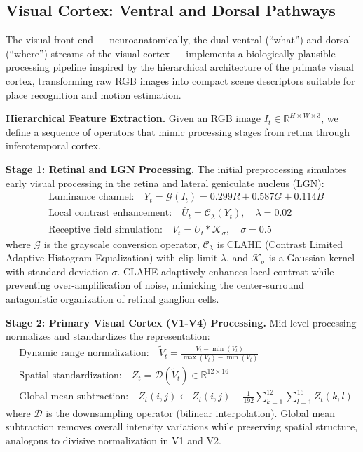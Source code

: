 \subsection{Visual Cortex: Ventral and Dorsal Pathways}
\label{sec:visual_cortex}

The visual front-end --- neuroanatomically, the dual ventral (``what'') and dorsal (``where'') streams of the visual cortex --- implements a biologically-plausible processing pipeline inspired by the hierarchical architecture of the primate visual cortex, transforming raw RGB images into compact scene descriptors suitable for place recognition and motion estimation.

\textbf{Hierarchical Feature Extraction.} Given an RGB image $I_t\in\mathbb{R}^{H\times W\times 3}$, we define a sequence of operators that mimic processing stages from retina through inferotemporal cortex.

\textbf{Stage 1: Retinal and LGN Processing.} The initial preprocessing simulates early visual processing in the retina and lateral geniculate nucleus (LGN):
\begin{align}
     & \text{Luminance channel:}\quad Y_t = \mathcal{G}(I_t) = 0.299R+0.587G+0.114B              \\
     & \text{Local contrast enhancement:}\quad \bar{U}_t = \mathcal{C}_\lambda(Y_t),\quad \lambda=0.02 \\
     & \text{Receptive field simulation:}\quad V_t = \bar{U}_t * \mathcal{K}_\sigma,\quad \sigma=0.5
\end{align}
where $\mathcal{G}$ is the grayscale conversion operator, $\mathcal{C}_\lambda$ is CLAHE (Contrast Limited Adaptive Histogram Equalization) with clip limit $\lambda$, and $\mathcal{K}_\sigma$ is a Gaussian kernel with standard deviation $\sigma$. CLAHE adaptively enhances local contrast while preventing over-amplification of noise, mimicking the center-surround antagonistic organization of retinal ganglion cells.

\textbf{Stage 2: Primary Visual Cortex (V1-V4) Processing.} Mid-level processing normalizes and standardizes the representation:
\begin{align}
     & \text{Dynamic range normalization:}\quad \tilde V_t = \frac{V_t-\min(V_t)}{\max(V_t)-\min(V_t)}     \\
     & \text{Spatial standardization:}\quad Z_t = \mathcal{D}(\tilde V_t)\in\mathbb{R}^{12\times16}        \\
     & \text{Global mean subtraction:}\quad Z_t(i,j)\leftarrow Z_t(i,j)-\frac{1}{192}\sum_{k=1}^{12}\sum_{l=1}^{16}Z_t(k,l)
\end{align}
where $\mathcal{D}$ is the downsampling operator (bilinear interpolation). Global mean subtraction removes overall intensity variations while preserving spatial structure, analogous to divisive normalization in V1 and V2.

